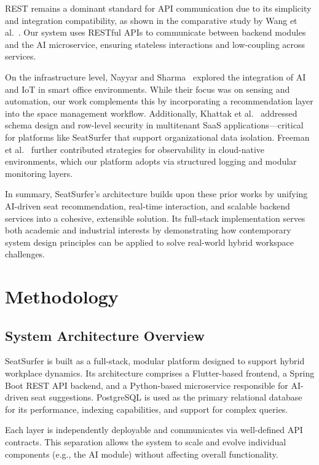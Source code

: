 \documentclass[onecolumn, 12pt]{IEEEtran}
\begin{document}
REST remains a dominant standard for API communication due to its simplicity and integration compatibility, as shown in the comparative study by Wang et al.~\cite{wang2022graphql}. Our system uses RESTful APIs to communicate between backend modules and the AI microservice, ensuring stateless interactions and low-coupling across services.

On the infrastructure level, Nayyar and Sharma~\cite{nayyar2021smart} explored the integration of AI and IoT in smart office environments. While their focus was on sensing and automation, our work complements this by incorporating a recommendation layer into the space management workflow. Additionally, Khattak et al.~\cite{khattak2021schemas} addressed schema design and row-level security in multitenant SaaS applications—critical for platforms like SeatSurfer that support organizational data isolation. Freeman et al.~\cite{freeman2022monitoring} further contributed strategies for observability in cloud-native environments, which our platform adopts via structured logging and modular monitoring layers.

In summary, SeatSurfer's architecture builds upon these prior works by unifying AI-driven seat recommendation, real-time interaction, and scalable backend services into a cohesive, extensible solution. Its full-stack implementation serves both academic and industrial interests by demonstrating how contemporary system design principles can be applied to solve real-world hybrid workspace challenges.

\section{Methodology}

\subsection{System Architecture Overview}

SeatSurfer is built as a full-stack, modular platform designed to support hybrid workplace dynamics. Its architecture comprises a Flutter-based frontend, a Spring Boot REST API backend, and a Python-based microservice responsible for AI-driven seat suggestions. PostgreSQL is used as the primary relational database for its performance, indexing capabilities, and support for complex queries.

Each layer is independently deployable and communicates via well-defined API contracts. This separation allows the system to scale and evolve individual components (e.g., the AI module) without affecting overall functionality.
\end{document}
